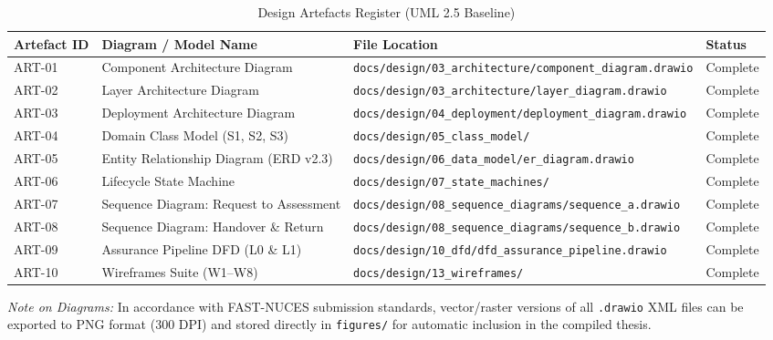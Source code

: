 \begin{table}[htbp]
\centering
\caption{Design Artefacts Register (UML 2.5 Baseline)}
\label{tab:design_artefacts}
\small
\begin{tabularx}{\textwidth}{l p{6.5cm} l l}
\toprule
\textbf{Artefact ID} & \textbf{Diagram / Model Name} & \textbf{File Location} & \textbf{Status} \\
\midrule
ART-01 & Component Architecture Diagram & \texttt{docs/design/03\_architecture/component\_diagram.drawio} & Complete \\
ART-02 & Layer Architecture Diagram & \texttt{docs/design/03\_architecture/layer\_diagram.drawio} & Complete \\
ART-03 & Deployment Architecture Diagram & \texttt{docs/design/04\_deployment/deployment\_diagram.drawio} & Complete \\
ART-04 & Domain Class Model (S1, S2, S3) & \texttt{docs/design/05\_class\_model/} & Complete \\
ART-05 & Entity Relationship Diagram (ERD v2.3) & \texttt{docs/design/06\_data\_model/er\_diagram.drawio} & Complete \\
ART-06 & Lifecycle State Machine & \texttt{docs/design/07\_state\_machines/} & Complete \\
ART-07 & Sequence Diagram: Request to Assessment & \texttt{docs/design/08\_sequence\_diagrams/sequence\_a.drawio} & Complete \\
ART-08 & Sequence Diagram: Handover \& Return & \texttt{docs/design/08\_sequence\_diagrams/sequence\_b.drawio} & Complete \\
ART-09 & Assurance Pipeline DFD (L0 \& L1) & \texttt{docs/design/10\_dfd/dfd\_assurance\_pipeline.drawio} & Complete \\
ART-10 & Wireframes Suite (W1--W8) & \texttt{docs/design/13\_wireframes/} & Complete \\
\bottomrule
\end{tabularx}
\end{table}
\textit{Note on Diagrams:} In accordance with FAST-NUCES submission standards, vector/raster versions of all \texttt{.drawio} XML files can be exported to PNG format (300 DPI) and stored directly in \texttt{figures/} for automatic inclusion in the compiled thesis.

